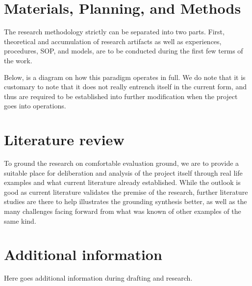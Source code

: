 \documentclass[twocolumn,letterpaper, 12pt]{article}
\begin{document}
\section{Materials, Planning, and Methods}\label{sec:methods}

The research methodology strictly can be separated into two parts. First, theoretical and accumulation of research artifacts as well as experiences, procedures, SOP, and models, are to be conducted during the first few terms of the work. 

Below, is a diagram on how this paradigm operates in full. We do note that it is customary to note that it does not really entrench itself in the current form, and thus are required to be established into further modification when the project goes into operations. 

\clearpage

\section{Literature review}

To ground the research on comfortable evaluation ground, we are to provide a suitable place for deliberation and analysis of the project itself through real life examples and what current literature already established. While the outlook is good as current literature validates the premise of the research, further literature studies are there to help illustrates the grounding synthesis better, as well as the many challenges facing forward from what was known of other examples of the same kind. 

\clearpage


\section{Additional information}

Here goes additional information during drafting and research. 
\end{document}
